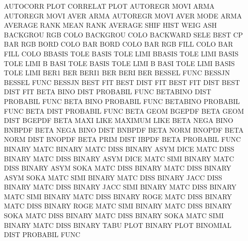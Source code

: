 AUTOCORR PLOT                           CORRELAT PLOT
AUTOREGR MOVI                           ARMA
AUTOREGR MOVI AVER                      ARMA
AUTOREGR MOVI AVER MODE                 ARMA
AVERAGE  RANK                           MEAN     RANK
AVERAGE  SHIF HIST WEIG                 ASH
BACKGROU RGB  COLO                      BACKGROU COLO
BACKWARD SELE                           BEST     CP
BAR      RGB  BORD COLO                 BAR      BORD COLO
BAR      RGB  FILL COLO                 BAR      FILL COLO
BBASIS   TOLE                           BASIS    TOLE LIMI
BBASIS   TOLE LIMI                      BASIS    TOLE LIMI
B        BASI TOLE                      BASIS    TOLE LIMI
B        BASI TOLE LIMI                 BASIS    TOLE LIMI
BER1                                    BER
BERI1                                   BER
BERI                                    BER
BESSEL   FUNC                           BESSJN
BESSEL   FUNC                           BESSJN
BEST     FIT                            BEST     DIST FIT
BEST     FIT  DIST                      BEST     DIST FIT
BETA     BINO DIST                      PROBABIL FUNC
BETABINO DIST                           PROBABIL FUNC
BETA     BINO                           PROBABIL FUNC
BETABINO                                PROBABIL FUNC
BETA     DIST                           PROBABIL FUNC
BETA     GEOM                           BGEPDF
BETA     GEOM DIST                      BGEPDF
BETA     MAXI LIKE                      MAXIMUM  LIKE
BETA     NEGA BINO                      BNBPDF
BETA     NEGA BINO DIST                 BNBPDF
BETA     NORM                           BNOPDF
BETA     NORM DIST                      BNOPDF
BETA     PRIM DIST                      IBPDF
BETA                                    PROBABIL FUNC
BINARY   MATC                           BINARY   MATC DISS
BINARY   ASYM DICE MATC DISS            BINARY   MATC DISS
BINARY   ASYM DICE MATC SIMI            BINARY   MATC DISS
BINARY   ASYM SOKA MATC DISS            BINARY   MATC DISS
BINARY   ASYM SOKA MATC SIMI            BINARY   MATC DISS
BINARY   JACC DISS                      BINARY   MATC DISS
BINARY   JACC SIMI                      BINARY   MATC DISS
BINARY   MATC SIMI                      BINARY   MATC DISS
BINARY   ROGE MATC DISS                 BINARY   MATC DISS
BINARY   ROGE MATC SIMI                 BINARY   MATC DISS
BINARY   SOKA MATC DISS                 BINARY   MATC DISS
BINARY   SOKA MATC SIMI                 BINARY   MATC DISS
BINARY   TABU PLOT                      BINARY   PLOT
BINOMIAL DIST                           PROBABIL FUNC
